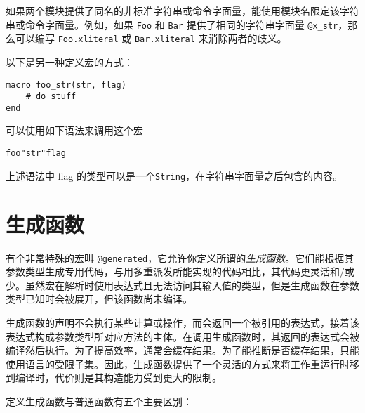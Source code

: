 如果两个模块提供了同名的非标准字符串或命令字面量，能使用模块名限定该字符串或命令字面量。例如，如果 \texttt{Foo} 和 \texttt{Bar} 提供了相同的字符串字面量 \texttt{@x\_str}，那么可以编写 \texttt{Foo.x{\textquotedbl}literal{\textquotedbl}} 或 \texttt{Bar.x{\textquotedbl}literal{\textquotedbl}} 来消除两者的歧义。



以下是另一种定义宏的方式：




\begin{verbatim}
macro foo_str(str, flag)
    # do stuff
end
\end{verbatim}



可以使用如下语法来调用这个宏




\begin{verbatim}
foo"str"flag
\end{verbatim}



上述语法中 flag 的类型可以是一个\texttt{String}，在字符串字面量之后包含的内容。



\hypertarget{925665269920917597}{}


\section{生成函数}



有个非常特殊的宏叫 \hyperlink{11479538870805927749}{\texttt{@generated}}，它允许你定义所谓的\emph{生成函数}。它们能根据其参数类型生成专用代码，与用多重派发所能实现的代码相比，其代码更灵活和/或少。虽然宏在解析时使用表达式且无法访问其输入值的类型，但是生成函数在参数类型已知时会被展开，但该函数尚未编译。



生成函数的声明不会执行某些计算或操作，而会返回一个被引用的表达式，接着该表达式构成参数类型所对应方法的主体。在调用生成函数时，其返回的表达式会被编译然后执行。为了提高效率，通常会缓存结果。为了能推断是否缓存结果，只能使用语言的受限子集。因此，生成函数提供了一个灵活的方式来将工作重运行时移到编译时，代价则是其构造能力受到更大的限制。



定义生成函数与普通函数有五个主要区别：



